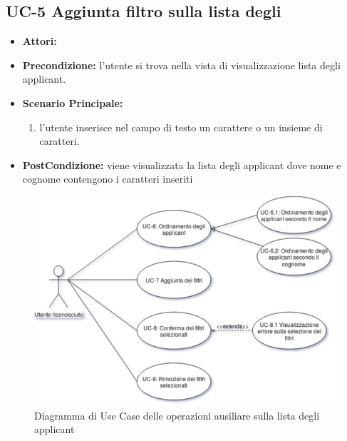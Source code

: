 \subsection{UC-5 Aggiunta filtro sulla lista degli\applicant}
\begin{itemize}
	\item \textbf{Attori:}\loggedusr
	\item \textbf{Precondizione:} l'utente si trova nella vista di visualizzazione lista degli applicant.
	\item \textbf{Scenario Principale:}
	\begin{enumerate}
		\item l'utente inserisce nel campo di testo un carattere o un insieme di caratteri.
	\end{enumerate}
	\item \textbf{PostCondizione:} viene visualizzata la lista degli applicant dove nome e cognome contengono i caratteri inseriti
\end{itemize}


\vspace{0.5em}
\begin{figure}[!h] 
	\centering 
	\includegraphics[width=1\columnwidth]{immagini/usecase/UC2} 
	\caption{Diagramma di Use Case delle operazioni ausiliare sulla lista degli applicant}
	\label{figura:uc-2}
\end{figure}

